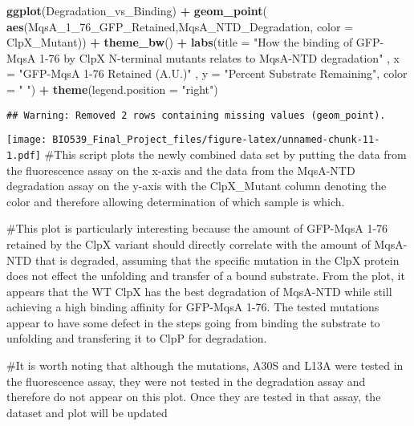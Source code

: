 \documentclass[]{article}
\newenvironment{Shaded}{\begin{snugshade}}{\end{snugshade}}
\newcommand{\DataTypeTok}[1]{\textcolor[rgb]{0.13,0.29,0.53}{#1}}
\newcommand{\DecValTok}[1]{\textcolor[rgb]{0.00,0.00,0.81}{#1}}
\newcommand{\KeywordTok}[1]{\textcolor[rgb]{0.13,0.29,0.53}{\textbf{#1}}}
\newcommand{\NormalTok}[1]{#1}
\newcommand{\OperatorTok}[1]{\textcolor[rgb]{0.81,0.36,0.00}{\textbf{#1}}}
\newcommand{\StringTok}[1]{\textcolor[rgb]{0.31,0.60,0.02}{#1}}
\begin{document}
\begin{Shaded}
\begin{Highlighting}[]
\KeywordTok{ggplot}\NormalTok{(Degradation_vs_Binding) }\OperatorTok{+}\StringTok{ }
\StringTok{  }\KeywordTok{geom_point}\NormalTok{( }\KeywordTok{aes}\NormalTok{(MqsA_}\DecValTok{1}\NormalTok{_}\DecValTok{76}\NormalTok{_GFP_Retained,MqsA_NTD_Degradation, }\DataTypeTok{color =}\NormalTok{ ClpX_Mutant)) }\OperatorTok{+}
\StringTok{  }\KeywordTok{theme_bw}\NormalTok{() }\OperatorTok{+}\StringTok{ }
\StringTok{  }\KeywordTok{labs}\NormalTok{(}\DataTypeTok{title =} \StringTok{"How the binding of GFP-MqsA 1-76 by ClpX N-terminal mutants relates to MqsA-NTD degradation"}\NormalTok{ , }
       \DataTypeTok{x =} \StringTok{"GFP-MqsA 1-76 Retained (A.U.)"}\NormalTok{ , }\DataTypeTok{y =} \StringTok{"Percent Substrate Remaining"}\NormalTok{, }\DataTypeTok{color =} \StringTok{" "}\NormalTok{) }\OperatorTok{+}
\StringTok{  }\KeywordTok{theme}\NormalTok{(}\DataTypeTok{legend.position =} \StringTok{"right"}\NormalTok{)}
\end{Highlighting}
\end{Shaded}

\begin{verbatim}
## Warning: Removed 2 rows containing missing values (geom_point).
\end{verbatim}

\texttt{[image: BIO539\_Final\_Project\_files/figure-latex/unnamed-chunk-11-1.pdf]}
\#This script plots the newly combined data set by putting the data from
the fluorescence assay on the x-axis and the data from the MqsA-NTD
degradation assay on the y-axis with the ClpX\_Mutant column denoting
the color and therefore allowing determination of which sample is which.

\#This plot is particularly interesting because the amount of GFP-MqsA
1-76 retained by the ClpX variant should directly correlate with the
amount of MqsA-NTD that is degraded, assuming that the specific mutation
in the ClpX protein does not effect the unfolding and transfer of a
bound substrate. From the plot, it appears that the WT ClpX has the best
degradation of MqsA-NTD while still achieving a high binding affinity
for GFP-MqsA 1-76. The tested mutations appear to have some defect in
the steps going from binding the substrate to unfolding and transfering
it to ClpP for degradation.

\#It is worth noting that although the mutations, A30S and L13A were
tested in the fluorescence assay, they were not tested in the
degradation assay and therefore do not appear on this plot. Once they
are tested in that assay, the dataset and plot will be updated
\end{document}
